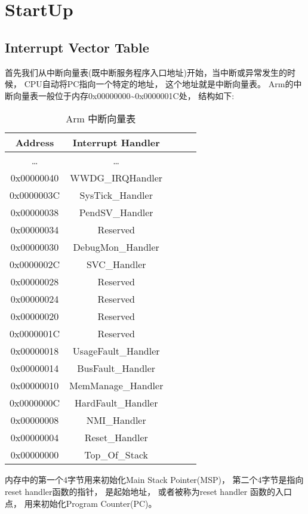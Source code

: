 \section{StartUp}
\subsection{Interrupt Vector Table}
首先我们从中断向量表(既中断服务程序入口地址)开始，当中断或异常发生的时候， CPU自动将PC指向一个特定的地址， 这个地址就是中断向量表。 Arm的中断向量表一般位于内存0x00000000\textasciitilde0x0000001C处， 结构如下:
\begin{table}[htbp]
    \caption{ Arm 中断向量表}\label{tab:table1}
    \vspace{0.5em}\centering\wuhao
    \begin{tabular}{ccccc}
    \toprule[1.5pt]
    Address & Interrupt Handler \\
    \midrule[1pt]
    \dots & \dots \\
    0x00000040 & WWDG\_IRQHandler \\
    0x0000003C & SysTick\_Handler \\
    0x00000038 & PendSV\_Handler \\
    0x00000034 & Reserved \\
    0x00000030 & DebugMon\_Handler \\
    0x0000002C & SVC\_Handler \\
    0x00000028 & Reserved \\
    0x00000024 & Reserved \\
    0x00000020 & Reserved \\
    0x0000001C & Reserved \\
    0x00000018 & UsageFault\_Handler \\
    0x00000014 & BusFault\_Handler \\
    0x00000010 & MemManage\_Handler \\
    0x0000000C & HardFault\_Handler \\
    0x00000008 & NMI\_Handler \\
    0x00000004 & Reset\_Handler \\
    0x00000000 & Top\_Of\_Stack \\
    \bottomrule[1.5pt]
    \end{tabular}
    \vspace{\baselineskip}
    \end{table}

内存中的第一个4字节用来初始化Main Stack Pointer(MSP)， 第二个4字节是指向reset handler函数的指针， 是起始地址， 或者被称为reset handler 函数的入口点， 用来初始化Program Counter(PC)。
